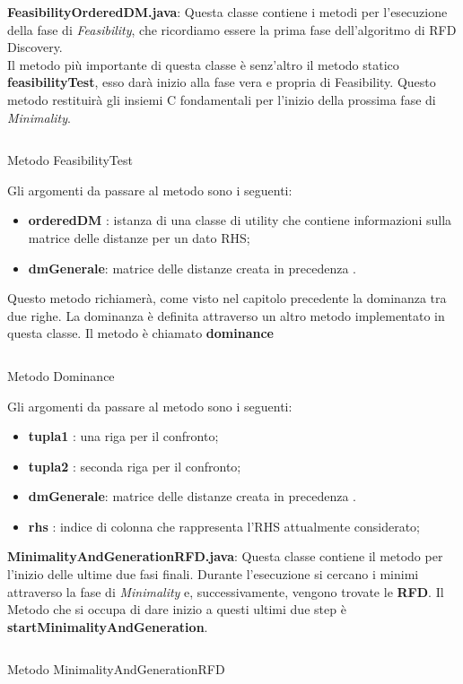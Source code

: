 \textbf{FeasibilityOrderedDM.java}:
Questa classe contiene i metodi per l'esecuzione della fase di \emph{Feasibility}, che ricordiamo essere la prima fase dell'algoritmo di RFD Discovery.\\
Il metodo più importante di questa classe è senz'altro il metodo statico \textbf{feasibilityTest}, esso darà inizio alla fase vera e propria di Feasibility.
Questo metodo restituirà gli insiemi C fondamentali per l'inizio della prossima fase di \emph{Minimality}.
\begin{listing}[H]
	\inputminted[]{java}{Codici/FeasibilityTest.java}
	\caption{Metodo FeasibilityTest}
	\label{Code:4}
\end{listing}
Gli argomenti da passare al metodo sono i seguenti:
\begin{itemize}
	\item \textbf{orderedDM} : istanza di una classe di utility che contiene informazioni sulla matrice delle distanze per un dato RHS;
	\item \textbf{dmGenerale}: matrice delle distanze creata in precedenza .
\end{itemize}
Questo metodo richiamerà, come visto nel capitolo precedente la dominanza tra due righe.
La dominanza è definita attraverso un altro metodo implementato in questa classe.
Il metodo è chiamato \textbf{dominance}
\begin{listing}[H]
	\inputminted[]{java}{Codici/Dominance.java}
	\caption{Metodo Dominance}
	\label{Code:5}
\end{listing}
Gli argomenti da passare al metodo sono i seguenti:
\begin{itemize}
	\item \textbf{tupla1} : una riga per il confronto;
	\item \textbf{tupla2} : seconda riga per il confronto;
	\item \textbf{dmGenerale}: matrice delle distanze creata in precedenza .
	\item \textbf{rhs} : indice di colonna che rappresenta l'RHS attualmente considerato;
\end{itemize}
\textbf{MinimalityAndGenerationRFD.java}:
Questa classe contiene il metodo per l'inizio delle ultime due fasi finali.
Durante l'esecuzione si cercano i minimi attraverso la fase di \emph{Minimality} e, successivamente, vengono trovate le \textbf{RFD}.
Il Metodo che si occupa di dare inizio a questi ultimi due step è \textbf{startMinimalityAndGeneration}.
\begin{listing}[H]
	\inputminted[]{java}{Codici/MinimalityAndGenerationRFD.java}
	\caption{Metodo MinimalityAndGenerationRFD}
	\label{Code:6}
\end{listing}
